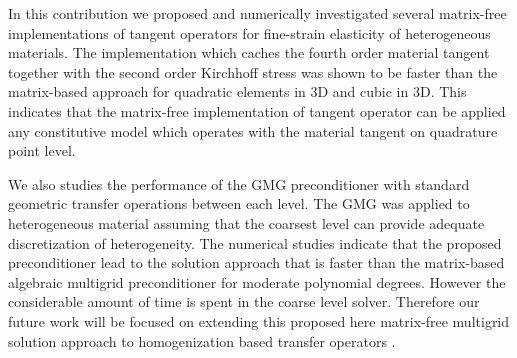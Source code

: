 \documentclass[preprint,12pt,times]{elsarticle}
\begin{document}
In this contribution we proposed and numerically investigated several matrix-free implementations of tangent operators for fine-strain elasticity of heterogeneous materials.
The implementation which caches the fourth order material tangent together with the second order Kirchhoff stress was shown to be faster than the matrix-based approach for quadratic elements in 3D and cubic in 3D.
This indicates that the matrix-free implementation of tangent operator can be applied any constitutive model which operates with the material tangent on quadrature point level.

We also studies the performance of the GMG preconditioner with standard geometric transfer operations between each level. The GMG was applied to heterogeneous material assuming that the coarsest level can provide adequate discretization of heterogeneity. The numerical studies indicate that the proposed preconditioner lead to the solution approach that is faster than the matrix-based algebraic multigrid preconditioner for moderate polynomial degrees. However the considerable amount of time is spent in the coarse level solver. Therefore our future work will be focused on extending this proposed here matrix-free multigrid solution approach to homogenization based transfer operators \cite{Miehe2007}.



\end{document}
